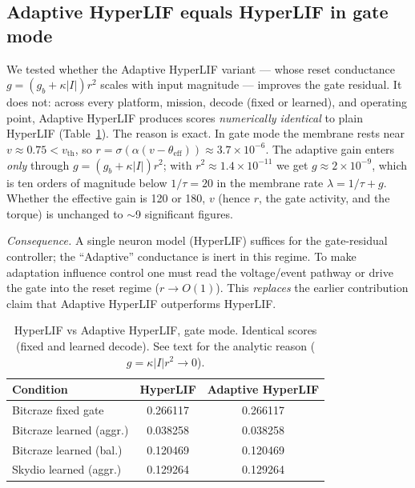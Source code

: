 \subsection{Adaptive HyperLIF equals HyperLIF in gate mode}
\label{sec:mech_equiv}
We tested whether the Adaptive HyperLIF variant --- whose reset conductance
$g=(g_b+\kappa|I|)r^2$ scales with input magnitude --- improves the gate residual.
It does not: across every platform, mission, decode (fixed or learned), and
operating point, Adaptive HyperLIF produces scores \emph{numerically identical} to
plain HyperLIF (Table~\ref{tab:equiv}). The reason is exact. In gate mode the
membrane rests near $v\!\approx\!0.75<v_\mathrm{th}$, so
$r=\sigma(\alpha(v-\theta_\mathrm{eff}))\approx 3.7\times10^{-6}$. The adaptive
gain enters \emph{only} through $g=(g_b+\kappa|I|)r^2$; with
$r^2\!\approx\!1.4\times10^{-11}$ we get $g\!\approx\!2\times10^{-9}$, which is ten
orders of magnitude below $1/\tau=20$ in the membrane rate $\lambda=1/\tau+g$.
Whether the effective gain is 120 or 180, $v$ (hence $r$, the gate activity, and
the torque) is unchanged to $\sim$9 significant figures.

\emph{Consequence.} A single neuron model (HyperLIF) suffices for the
gate-residual controller; the ``Adaptive'' conductance is inert in this regime. To
make adaptation influence control one must read the voltage/event pathway or drive
the gate into the reset regime ($r\!\rightarrow\!O(1)$). This \emph{replaces} the
earlier contribution claim that Adaptive HyperLIF outperforms HyperLIF.

\begin{table}[t]
\caption{HyperLIF vs Adaptive HyperLIF, gate mode. Identical scores (fixed and
learned decode). See text for the analytic reason ($g=\kappa|I|r^2\!\to\!0$).}
\label{tab:equiv}
\centering\small
\begin{tabular}{@{}lcc@{}}
\toprule
Condition & HyperLIF & Adaptive HyperLIF \\
\midrule
Bitcraze fixed gate & 0.266117 & 0.266117 \\
Bitcraze learned (aggr.) & 0.038258 & 0.038258 \\
Bitcraze learned (bal.) & 0.120469 & 0.120469 \\
Skydio learned (aggr.) & 0.129264 & 0.129264 \\
\bottomrule
\end{tabular}
\end{table}


